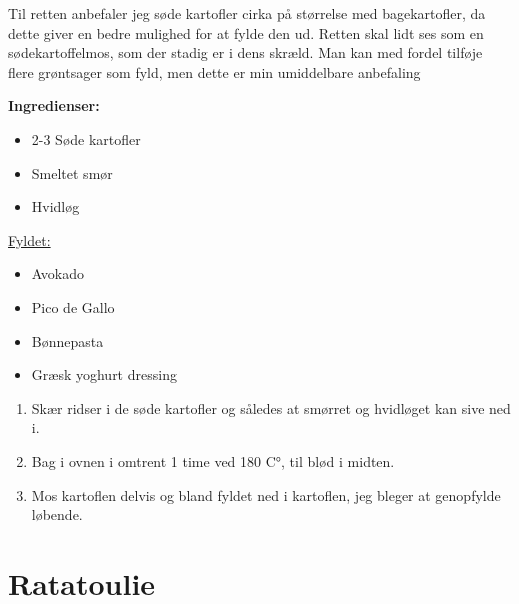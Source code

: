 \documentclass{book}
\begin{document}
Til retten anbefaler jeg søde kartofler cirka på størrelse med bagekartofler, da dette giver en bedre mulighed for at fylde den ud. Retten skal lidt ses som en sødekartoffelmos, som der stadig er i dens skræld. Man kan med fordel tilføje flere grøntsager som fyld, men dette er min umiddelbare anbefaling\\
\begin{minipage}[t]{0.5\textwidth}
\textbf{Ingredienser:}
\begin{itemize}
    \item 2-3 Søde kartofler
    \item Smeltet smør
    \item Hvidløg
\end{itemize}
\underline{Fyldet:}
\begin{itemize}
    \item Avokado 
    \item Pico de Gallo
    \item Bønnepasta
    \item Græsk yoghurt dressing 
\end{itemize}
\end{minipage}
\begin{minipage}[t]{0.5\textwidth}
\begin{enumerate}
    \item Skær ridser i de søde kartofler og således at smørret og hvidløget kan sive ned i.
    \item Bag i ovnen i omtrent 1 time ved 180 C°, til blød i midten.
    \item Mos kartoflen delvis og bland fyldet ned i kartoflen, jeg bleger at genopfylde løbende.  
\end{enumerate}
\end{minipage}
\newpage
{}
\newpage \section{Ratatoulie}
\end{document}
